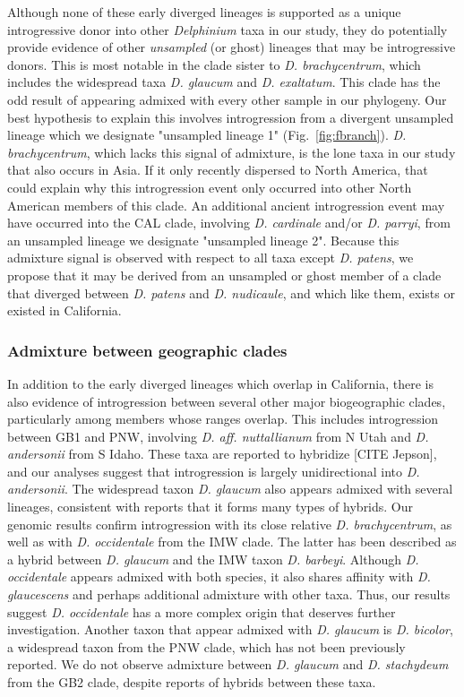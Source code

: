 \documentclass[11pt]{article}
\begin{document}
Although none of these early diverged lineages is supported as a unique introgressive
donor into other \emph{Delphinium} taxa in our study, they do potentially provide 
evidence of other \emph{unsampled} (or ghost) lineages that may be introgressive donors.
This is most notable in the clade sister to \emph{D. brachycentrum}, which includes 
the widespread taxa \emph{D. glaucum} and \emph{D. exaltatum}. 
This clade has the odd result of appearing admixed with every other sample in our 
phylogeny.
Our best hypothesis to explain this involves introgression from a divergent unsampled
lineage which we designate "unsampled lineage 1" (Fig.~\ref{fig:fbranch}). 
% 
\emph{D. brachycentrum}, which lacks this signal of admixture, is the lone taxa in our
study that also occurs in Asia. If it only recently dispersed to North America, that 
could explain why this introgression event only occurred into other North American 
members of this clade.
% 
An additional ancient introgression event may have occurred into the CAL clade, 
involving \emph{D. cardinale} and/or \emph{D. parryi}, from an unsampled lineage we 
designate "unsampled lineage 2". Because this admixture signal is observed with respect 
to all taxa except \emph{D. patens}, we propose that it may be derived from an unsampled 
or ghost member of a clade that diverged between \emph{D. patens} and \emph{D. nudicaule}, 
and which like them, exists or existed in California. 


\subsubsection{Admixture between geographic clades}
% 
In addition to the early diverged lineages which overlap in California, there is
also evidence of introgression between several other major biogeographic
clades, particularly among members whose ranges overlap.
% 
This includes introgression between GB1 and PNW, involving \emph{D. aff. nuttallianum}
from N Utah and \emph{D. andersonii} from S Idaho. These taxa are reported to 
hybridize [CITE Jepson], and our analyses suggest that introgression is largely 
unidirectional into \emph{D. andersonii}.
% 
The widespread taxon \emph{D. glaucum} also appears admixed with several lineages, 
consistent with reports that it forms many types of hybrids.
Our genomic results confirm introgression with its close relative \emph{D. brachycentrum}, 
as well as with \emph{D. occidentale} from the IMW clade. 
The latter has been described as a hybrid between \emph{D. glaucum} and the 
IMW taxon \emph{D. barbeyi}. Although \emph{D. occidentale} appears admixed with both
species, it also shares affinity with \emph{D. glaucescens} and perhaps additional 
admixture with other taxa. Thus, our results suggest \emph{D. occidentale} has a more 
complex origin that deserves further investigation.
% 
Another taxon that appear admixed with \emph{D. glaucum} is \emph{D. bicolor},
a widespread taxon from the PNW clade, which has not been previously reported. 
We do not observe admixture between \emph{D. glaucum} and \emph{D. stachydeum} 
from the GB2 clade, despite reports of hybrids between these taxa.
% 
\end{document}
